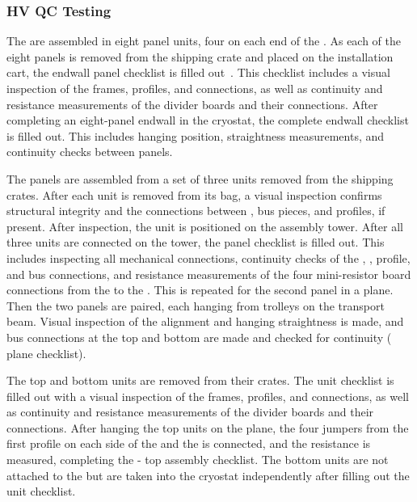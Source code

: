\subsubsection{HV QC Testing}

The  are assembled in eight panel units, four on each end of the .  
As each of the eight panels is  removed from the shipping crate and placed on the installation cart, the endwall panel checklist is filled out~\cite{bib:docdb10452}.
This checklist includes a visual inspection of the frames, profiles, and connections, as well as continuity and resistance measurements of the divider boards and their connections.  
After completing an eight-panel endwall in the cryostat, the complete endwall checklist is filled out.  
This includes hanging position, straightness measurements, and continuity checks between panels.

The  panels are assembled from a set of three units removed from the shipping crates.  
After each unit is removed from its bag, a visual inspection confirms structural integrity and the connections between ,  bus pieces, and profiles, if present.  
After inspection, the unit is positioned on the  assembly tower.  
After all three units are connected on the tower, the  panel checklist is filled out.  
This includes inspecting all mechanical connections, continuity checks of the , , profile, and  bus connections, and resistance measurements of the four mini-resistor board connections from the  to the .  
This is repeated for the second panel in a  plane.  Then the two panels are paired, each hanging from trolleys on the transport beam.  
Visual inspection of the alignment and hanging straightness is made, and  bus connections at the top and bottom are made and checked for continuity ( plane checklist).

The  top and bottom units are removed from their crates.  The  unit checklist is filled out with a visual inspection of the frames, profiles, and connections, as well as continuity and resistance measurements of the divider boards and their connections.  
After hanging the top  units on the  plane, the four jumpers from the first  profile on each side of the  and the   is connected, and the resistance is measured, completing the - top assembly checklist. 
The  bottom units are not attached to the  but are taken into the cryostat independently after filling out the  unit checklist.

